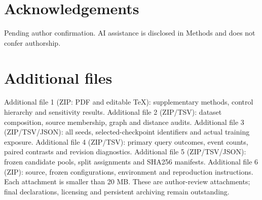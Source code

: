 \documentclass[12pt]{article}
\begin{document}
\section*{Acknowledgements}
Pending author confirmation. AI assistance is disclosed in Methods and does
not confer authorship.

\section*{Additional files}
Additional file 1 (ZIP: PDF and editable TeX): supplementary methods, control
hierarchy and sensitivity results. Additional file 2 (ZIP/TSV): dataset
composition, source membership, graph and distance audits. Additional file 3
(ZIP/TSV/JSON): all seeds, selected-checkpoint identifiers and actual training exposure.
Additional file 4 (ZIP/TSV): primary query outcomes, event counts, paired
contrasts and revision diagnostics. Additional file 5 (ZIP/TSV/JSON): frozen
candidate pools, split assignments and SHA256 manifests. Additional file 6
(ZIP): source, frozen configurations, environment and reproduction instructions.
Each attachment is smaller than 20 MB. These are author-review attachments;
final declarations, licensing and persistent archiving remain outstanding.
\end{document}

